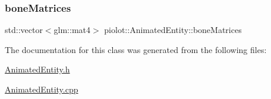 \subsubsection{\texorpdfstring{bone\+Matrices}{boneMatrices}}
{\footnotesize\ttfamily std\+::vector$<$glm\+::mat4$>$ piolot\+::\+Animated\+Entity\+::bone\+Matrices\hspace{0.3cm}{\ttfamily [protected]}}



The documentation for this class was generated from the following files\+:\begin{DoxyCompactItemize}
\item 
\mbox{\hyperlink{_animated_entity_8h}{Animated\+Entity.\+h}}\item 
\mbox{\hyperlink{_animated_entity_8cpp}{Animated\+Entity.\+cpp}}\end{DoxyCompactItemize}
